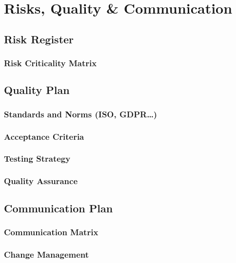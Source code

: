 \chapter{Risks, Quality \& Communication}
    \section{Risk Register}
        \subsection{Risk Criticality Matrix}
    \section{Quality Plan}
        \subsection{Standards and Norms (ISO, GDPR…)}
        \subsection{Acceptance Criteria}
        \subsection{Testing Strategy}
        \subsection{Quality Assurance}
    \section{Communication Plan}
        \subsection{Communication Matrix}
        \subsection{Change Management}